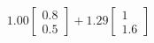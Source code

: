 \documentclass[preview]{standalone}
\begin{document}
\begin{align*}
1.00 \begin{bmatrix} 0.8 \\ 0.5 \end{bmatrix} + 1.29 \begin{bmatrix} 1 \\ 1.6 \end{bmatrix}
\end{align*}
\end{document}
